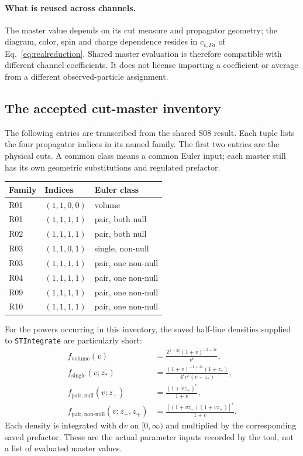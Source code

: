 \documentclass[11pt,a4paper]{article}
\newcommand{\dd}{\mathrm{d}}
\newcommand{\eps}{\epsilon}
\begin{document}
\paragraph{What is reused across channels.}
The master value depends on its cut measure and propagator geometry;
the diagram, color, spin and charge dependence resides in
$c_{c,\Gamma a}$ of Eq.~\eqref{eq:realreduction}. Shared master
evaluation is therefore compatible with different channel coefficients.
It does not license importing a coefficient or average from a different
observed-particle assignment.

\subsection{The accepted cut-master inventory}

The following entries are transcribed from the shared S08 result. Each
tuple lists the four propagator indices in its named family. The first
two entries are the physical cuts. A common class means a common Euler
input; each master still has its own geometric substitutions and
regulated prefactor.

\begin{center}
\begin{tabular}{@{}lll@{}}
\toprule
Family & Indices & Euler class\\
\midrule
R01 & $(1,1,0,0)$ & volume\\
R01 & $(1,1,1,1)$ & pair, both null\\
R02 & $(1,1,1,1)$ & pair, both null\\
R03 & $(1,1,0,1)$ & single, non-null\\
R03 & $(1,1,1,1)$ & pair, one non-null\\
R04 & $(1,1,1,1)$ & pair, one non-null\\
R09 & $(1,1,1,1)$ & pair, one non-null\\
R10 & $(1,1,1,1)$ & pair, one non-null\\
\bottomrule
\end{tabular}
\end{center}

For the powers occurring in this inventory, the saved half-line
densities supplied to \texttt{STIntegrate} are particularly short:
\begin{align}
 f_{\mathrm{volume}}(v)&=
 \frac{2^{1-2\eps}(1+v)^{-2+2\eps}}{v^\eps},\\
 f_{\mathrm{single}}(v;z_*)&=
 \frac{(1+v)^{-1+2\eps}(1+z_*)}{4^\eps v^\eps(v+z_*)},\\
 f_{\mathrm{pair,null}}(v;z_+)&=
 \frac{(1+vz_+)^\eps}{1+v},\\
 f_{\mathrm{pair,non\mbox{-}null}}(v;z_-,z_+)&=
 \frac{[(1+vz_-)(1+vz_+)]^\eps}{1+v}.
 \label{eq:actualcutdensities}
\end{align}
Each density is integrated with $\dd v$ on $[0,\infty)$ and multiplied
by the corresponding saved prefactor. These are the actual parameter
inputs recorded by the tool, not a list of evaluated master values.
\end{document}
